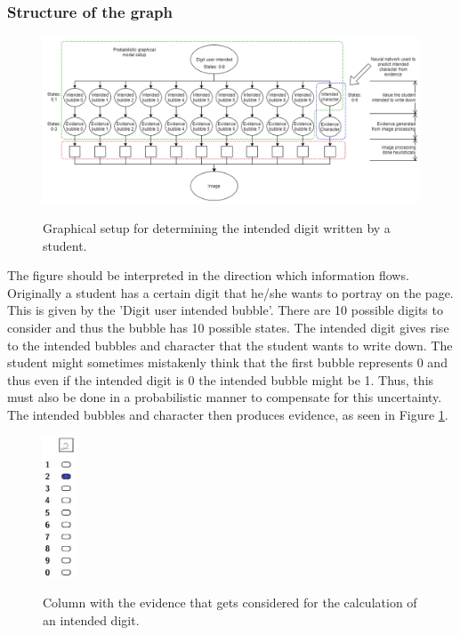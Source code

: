 \subsubsection{Structure of the graph}


\begin{figure}
  \centering
  \includegraphics[width=16cm]{pgmDigit}\\
  \caption{Graphical setup for determining the intended digit written by a student.}
  \label{fig:pgmDigit}
\end{figure}


The figure should be interpreted in the direction which information flows. Originally a student has a certain digit that he/she wants to portray on the page. This is given by the 'Digit user intended bubble'. There are 10 possible digits to consider and thus the bubble has 10 possible states. The intended digit gives rise to the intended bubbles and character that the student wants to write down. The student might sometimes mistakenly think that the first bubble represents 0 and thus even if the intended digit is 0 the intended bubble might be 1. Thus, this must also be done in a probabilistic manner to compensate for this uncertainty. The intended bubbles and character then produces evidence, as seen in Figure \ref{fig:pgmDigit}.  

\begin{figure}
  \centering
  \includegraphics[width=1cm]{column}\\
  \caption{Column with the evidence that gets considered for the calculation of an intended digit.}
  \label{fig:column}
\end{figure}

